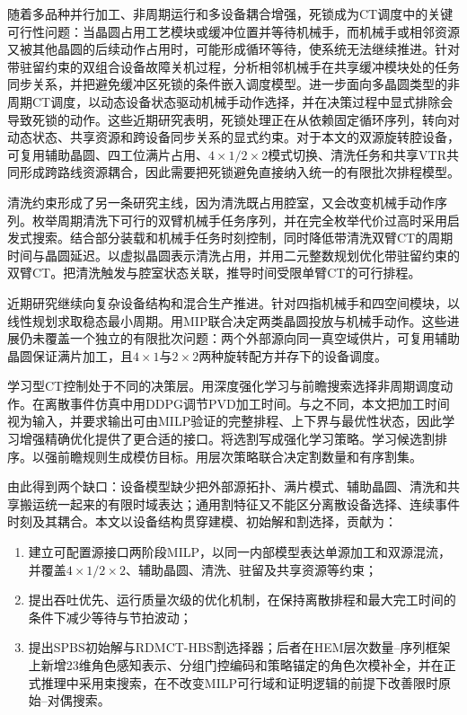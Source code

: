 \documentclass[final,5p,times,twocolumn]{elsarticle}
\newcommand{\method}{RDMCT-HBS}
\begin{document}
随着多品种并行加工、非周期运行和多设备耦合增强，死锁成为CT调度中的关键可行性问题：当晶圆占用工艺模块或缓冲位置并等待机械手，而机械手或相邻资源又被其他晶圆的后续动作占用时，可能形成循环等待，使系统无法继续推进。\citet{zhu2025failuredeadlock}针对带驻留约束的双组合设备故障关机过程，分析相邻机械手在共享缓冲模块处的任务同步关系，并把避免缓冲区死锁的条件嵌入调度模型。\citet{kim2025noncyclicdeadlock}进一步面向多晶圆类型的非周期CT调度，以动态设备状态驱动机械手动作选择，并在决策过程中显式排除会导致死锁的动作。这些近期研究表明，死锁处理正在从依赖固定循环序列，转向对动态状态、共享资源和跨设备同步关系的显式约束。对于本文的双源旋转腔设备，可复用辅助晶圆、四工位满片占用、$4\times1/2\times2$模式切换、清洗任务和共享VTR共同形成跨路线资源耦合，因此需要把死锁避免直接纳入统一的有限批次排程模型。

清洗约束形成了另一条研究主线，因为清洗既占用腔室，又会改变机械手动作序列。\citet{kim2013cleaning}枚举周期清洗下可行的双臂机械手任务序列，并在完全枚举代价过高时采用启发式搜索。\citet{yu2020delay}结合部分装载和机械手任务时刻控制，同时降低带清洗双臂CT的周期时间与晶圆延迟。\citet{qiao2022binary}以虚拟晶圆表示清洗占用，并用二元整数规划优化带驻留约束的双臂CT。\citet{li2022conditioncleaning}把清洗触发与腔室状态关联，推导时间受限单臂CT的可行排程。

近期研究继续向复杂设备结构和混合生产推进。\citet{gu2024multifinger}针对四指机械手和四空间模块，以线性规划求取稳态最小周期。\citet{yang2025miptwowafers}用MIP联合决定两类晶圆投放与机械手动作。这些进展仍未覆盖一个独立的有限批次问题：两个外部源向同一真空域供片，可复用辅助晶圆保证满片加工，且$4\times1$与$2\times2$两种旋转配方并存下的设备调度。

学习型CT控制处于不同的决策层。\citet{kim2025adaptivecluster}用深度强化学习与前瞻搜索选择非周期调度动作。\citet{hong2026ddpgct}在离散事件仿真中用DDPG调节PVD加工时间。与之不同，本文把加工时间视为输入，并要求输出可由MILP验证的完整排程、上下界与最优性状态，因此学习增强精确优化提供了更合适的接口。\citet{tang2020cut}将选割写成强化学习策略。\citet{huang2022cutranking}学习候选割排序。\citet{paulus2022looking}以强前瞻规则生成模仿目标。\citet{wang2023hem}用层次策略联合决定割数量和有序割集。

由此得到两个缺口：设备模型缺少把外部源拓扑、满片模式、辅助晶圆、清洗和共享搬运统一起来的有限时域表达；通用割特征又不能区分离散设备选择、连续事件时刻及其耦合。本文以设备结构贯穿建模、初始解和割选择，贡献为：
\begin{enumerate}[leftmargin=*]
\item 建立可配置源接口两阶段MILP，以同一内部模型表达单源加工和双源混流，并覆盖$4\times1/2\times2$、辅助晶圆、清洗、驻留及共享资源等约束；
\item 提出吞吐优先、运行质量次级的优化机制，在保持离散排程和最大完工时间的条件下减少等待与节拍波动；
\item 提出SPBS初始解与\method{}割选择器；后者在HEM层次数量--序列框架上新增23维角色感知表示、分组门控编码和策略锚定的角色次模补全，并在正式推理中采用束搜索，在不改变MILP可行域和证明逻辑的前提下改善限时原始--对偶搜索。
\end{enumerate}
\end{document}
